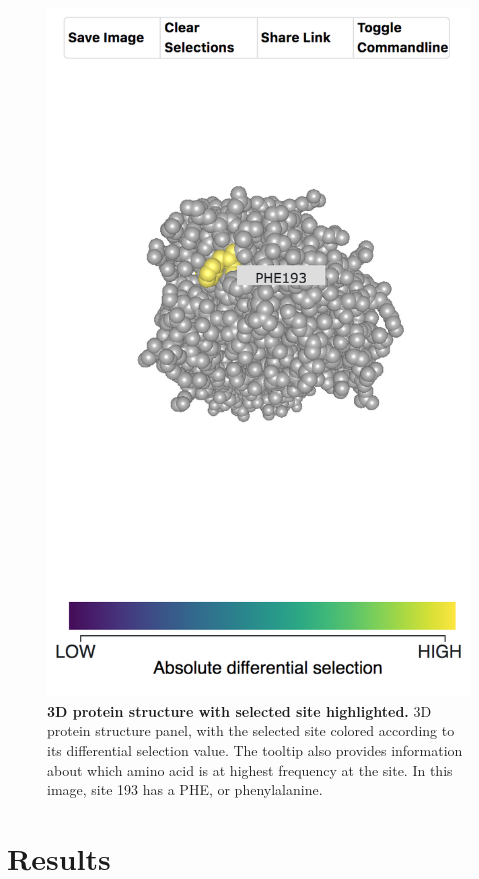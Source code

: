 \documentclass[sigchi, nonacm]{acmart}
\begin{document}
\begin{figure}[H]
	\includegraphics[width=1.0\textwidth]{3d-structure-panel.png}
	\caption{\textbf{3D protein structure with selected site highlighted.}
  3D protein structure panel, with the selected site colored according to its differential selection value.
The tooltip also provides information about which amino acid is at highest frequency at the site.
In this image, site 193 has a PHE, or phenylalanine.
  }
	\label{3d-structure}
\end{figure}

\section{Results}
\end{document}
